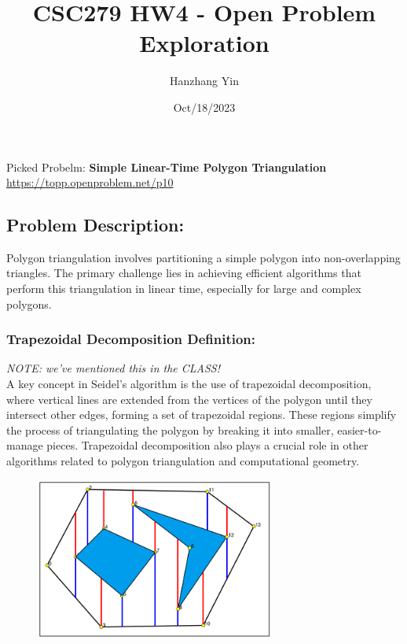 \documentclass{article}
\title{CSC279 HW4 - Open Problem Exploration}
\author{Hanzhang Yin}
\date{Oct/18/2023}
\begin{document}
\maketitle

\noindent Picked Probelm: \textbf{Simple Linear-Time Polygon Triangulation} 
\\
\url{https://topp.openproblem.net/p10}

\subsection*{Problem Description:}
Polygon triangulation involves partitioning a simple polygon into non-overlapping triangles.
The primary challenge lies in achieving efficient algorithms that perform this triangulation in linear time, especially for large and complex polygons.

\subsubsection*{Trapezoidal Decomposition Definition: }
\textit{NOTE: we've mentioned this in the CLASS!}
\\
A key concept in Seidel's algorithm is the use of trapezoidal decomposition, where vertical lines are extended from the vertices of the polygon until they intersect other edges, forming a set of trapezoidal regions. These regions simplify the process of triangulating the polygon by breaking it into smaller, easier-to-manage pieces. Trapezoidal decomposition also plays a crucial role in other algorithms related to polygon triangulation and computational geometry.
\begin{figure}[h]
    \centering
    \includegraphics[width=0.7\textwidth]{TrapDecomp.png}
    \label{fig:model}
\end{figure}
\end{document}
